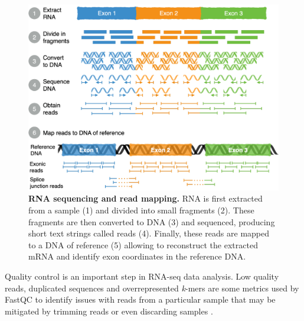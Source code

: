 \begin{figure}[!htb]
  \centering
  \includegraphics[width=.8\linewidth]{images/intro/rna-seq}
  \caption[RNA sequencing and read mapping]{\textbf{RNA sequencing and read mapping.} RNA is first extracted from a sample (1) and divided into small fragments (2). These fragments are then converted to DNA (3) and sequenced, producing short text strings called reads (4). Finally, these reads are mapped to a DNA of reference (5) allowing to reconstruct the extracted mRNA and identify exon coordinates in the reference DNA.}
  \label{fig:RNAseq}
\end{figure}



Quality control is an important step in RNA-seq data analysis. Low quality reads, duplicated sequences and overrepresented \emph{k}-mers are some metrics used by FastQC to identify issues with reads from a particular sample that may be mitigated by trimming reads or even discarding samples \cite{andrews:2019vg}. %

